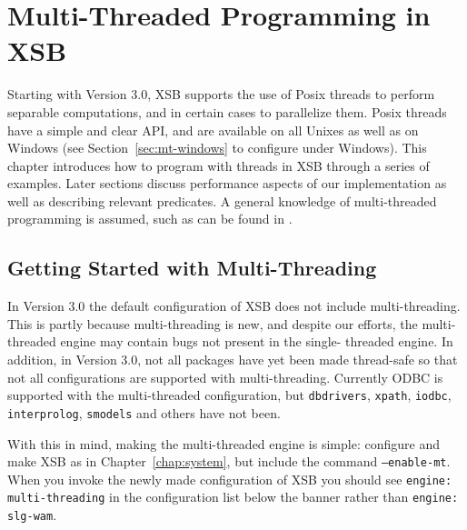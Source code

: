 \chapter{Multi-Threaded Programming in XSB} \label{chap:threads}

Starting with Version 3.0, XSB supports the use of Posix threads to
perform separable computations, and in certain cases to parallelize
them.  Posix threads have a simple and clear API, and are available on
all Unixes as well as on Windows (see Section~\ref{sec:mt-windows} to
configure under Windows).  This chapter introduces how to program with
threads in XSB through a series of examples.  Later sections discuss
performance aspects of our implementation as well as describing
relevant predicates.  A general knowledge of multi-threaded
programming is assumed, such as can be found in \cite{LewB98,Bute97}.

\section{Getting Started with Multi-Threading}
%
In Version 3.0 the default configuration of XSB does not include
multi-threading.  This is partly because multi-threading is new, and
despite our efforts, the multi-threaded engine may contain bugs not
present in the single- threaded engine.  In addition, in Version 3.0,
not all packages have yet been made thread-safe so that not all
configurations are supported with multi-threading.  Currently ODBC is
supported with the multi-threaded configuration, but {\tt dbdrivers},
{\tt xpath}, {\tt iodbc}, {\tt interprolog}, {\tt smodels} and others
have not been.

With this in mind, making the multi-threaded engine is simple:
configure and make XSB as in Chapter~\ref{chap:system}, but include
the command {\tt --enable-mt}.  When you invoke the newly made
configuration of XSB you should see {\tt engine: multi-threading} in
the configuration list below the banner rather than {\tt engine:
  slg-wam}.

